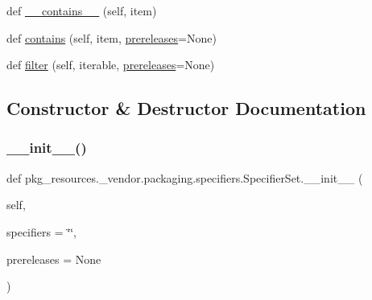 \begin{DoxyCompactItemize}
\item 
def \hyperlink{classpkg__resources_1_1__vendor_1_1packaging_1_1specifiers_1_1SpecifierSet_af68a49be1fe37bc12da13ca6ac4b9e49}{\+\_\+\+\_\+contains\+\_\+\+\_\+} (self, item)
\item 
def \hyperlink{classpkg__resources_1_1__vendor_1_1packaging_1_1specifiers_1_1SpecifierSet_a666f0adbbfdf76a5747216f3f5255fc9}{contains} (self, item, \hyperlink{classpkg__resources_1_1__vendor_1_1packaging_1_1specifiers_1_1SpecifierSet_a8d40983e7e62eac0fba7c36aec5da9ba}{prereleases}=None)
\item 
def \hyperlink{classpkg__resources_1_1__vendor_1_1packaging_1_1specifiers_1_1SpecifierSet_a3949d930e10663288d4aab13ba3b0cb0}{filter} (self, iterable, \hyperlink{classpkg__resources_1_1__vendor_1_1packaging_1_1specifiers_1_1SpecifierSet_a8d40983e7e62eac0fba7c36aec5da9ba}{prereleases}=None)
\end{DoxyCompactItemize}


\subsection{Constructor \& Destructor Documentation}
\mbox{\label{classpkg__resources_1_1__vendor_1_1packaging_1_1specifiers_1_1SpecifierSet_ae59b28230a31d73061d4e965fada4f17}} 
\subsubsection{\texorpdfstring{\+\_\+\+\_\+init\+\_\+\+\_\+()}{\_\_init\_\_()}}
{\footnotesize\ttfamily def pkg\+\_\+resources.\+\_\+vendor.\+packaging.\+specifiers.\+Specifier\+Set.\+\_\+\+\_\+init\+\_\+\+\_\+ (\begin{DoxyParamCaption}\item[{}]{self,  }\item[{}]{specifiers = {\ttfamily \char`\"{}\char`\"{}},  }\item[{}]{prereleases = {\ttfamily None} }\end{DoxyParamCaption})}



